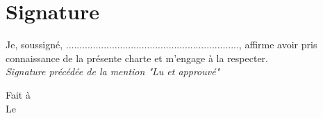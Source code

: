 \documentclass[10pt,a4paper]{article}
\begin{document}
\section{Signature}
Je, soussigné, ................................................................, affirme avoir pris connaissance de la présente charte et m'engage à la respecter.\\

\textit{Signature précédée de la mention "Lu et approuvé"}

\begin{flushright}
\begin{minipage}{0.4\linewidth}
Fait à  \dotfill\\
Le \dotfill
\end{minipage}
\end{flushright}
\end{document}
